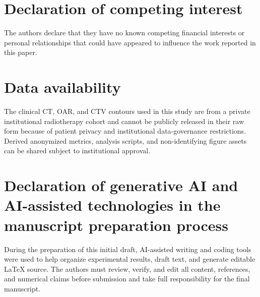 \documentclass[preprint,12pt]{elsarticle}
\begin{document}
\section*{Declaration of competing interest}

The authors declare that they have no known competing financial interests or personal relationships that could have appeared to influence the work reported in this paper.

\section*{Data availability}

The clinical CT, OAR, and CTV contours used in this study are from a private institutional radiotherapy cohort and cannot be publicly released in their raw form because of patient privacy and institutional data-governance restrictions. Derived anonymized metrics, analysis scripts, and non-identifying figure assets can be shared subject to institutional approval.

\section*{Declaration of generative AI and AI-assisted technologies in the manuscript preparation process}

During the preparation of this initial draft, AI-assisted writing and coding tools were used to help organize experimental results, draft text, and generate editable LaTeX source. The authors must review, verify, and edit all content, references, and numerical claims before submission and take full responsibility for the final manuscript.



\end{document}
